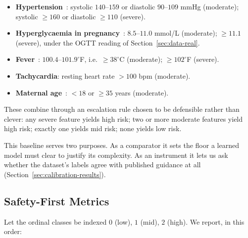\documentclass[journal]{IEEEtran}
\begin{document}
\begin{itemize}
\item \textbf{Hypertension}~\cite{isshp2018}: systolic $140$--$159$ or diastolic
$90$--$109$ mmHg (moderate); systolic $\geq 160$ or diastolic $\geq 110$
(severe).
\item \textbf{Hyperglycaemia in pregnancy}~\cite{who-hip-2013}: $8.5$--$11.0$
mmol/L (moderate); $\geq 11.1$ (severe), under the OGTT reading of
Section~\ref{sec:data-real}.
\item \textbf{Fever}~\cite{who-imppc}: $100.4$--$101.9^\circ$F, i.e.\
$\geq 38^\circ$C (moderate); $\geq 102^\circ$F (severe).
\item \textbf{Tachycardia}: resting heart rate $>100$ bpm (moderate).
\item \textbf{Maternal age}~\cite{who-anc-2016}: $<18$ or $\geq 35$ years
(moderate).
\end{itemize}

These combine through an escalation rule chosen to be defensible rather than
clever: any severe feature yields high risk; two or more moderate features yield
high risk; exactly one yields mid risk; none yields low risk.

This baseline serves two purposes. As a comparator it sets the floor a learned
model must clear to justify its complexity. As an instrument it lets us ask
whether the dataset's labels agree with published guidance at all
(Section~\ref{sec:calibration-results}).

\subsection{Safety-First Metrics}
\label{sec:metrics}

Let the ordinal classes be indexed $0$ (low), $1$ (mid), $2$ (high). We report,
in this order:
\end{document}
